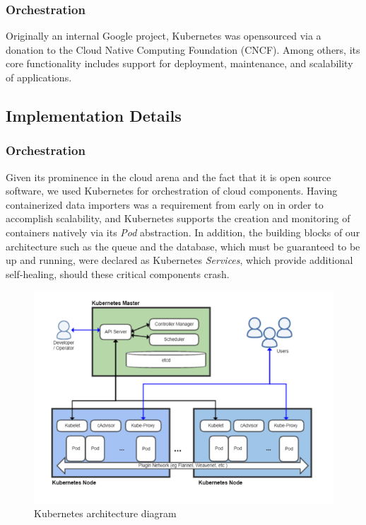 \subsubsection{Orchestration}\label{orchestration}

Originally an internal Google project, Kubernetes was opensourced via a
donation to the Cloud Native Computing Foundation (CNCF). Among others,
its core functionality includes support for deployment, maintenance, and
scalability of applications.

\subsection{Implementation Details}\label{implementation-details}

\subsubsection{Orchestration}\label{orchestration-1}

Given its prominence in the cloud arena and the fact that it is open
source software, we used Kubernetes for orchestration of cloud
components. Having containerized data importers was a requirement from
early on in order to accomplish scalability, and Kubernetes supports the
creation and monitoring of containers natively via its \emph{Pod}
abstraction. In addition, the building blocks of our architecture such
as the queue and the database, which must be guaranteed to be up and
running, were declared as Kubernetes \emph{Services}, which provide
additional self-healing, should these critical components crash.

\begin{figure}[htbp]
  \centering
  \includegraphics[scale=0.5]{images/Kubernetes.png}
  \caption{Kubernetes architecture diagram \cite{WikiCommons:KubernetesArchitecture}}
\end{figure}

